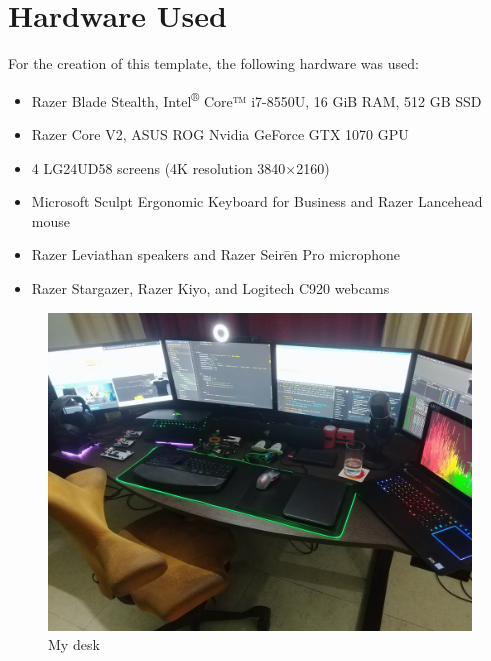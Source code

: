 \chapter{Hardware Used}
For the creation of this template, the following hardware was used:
\begin{itemize}
\item {}Razer Blade Stealth, Intel\textsuperscript{®} Core™ i7-8550U, 16 GiB RAM, 512 GB SSD
\item Razer Core V2, ASUS ROG Nvidia GeForce GTX 1070 GPU
\item 4 LG24UD58 screens (4K resolution 3840×2160)
\item {}Microsoft Sculpt Ergonomic Keyboard for Business and Razer Lancehead mouse
\item Razer Leviathan speakers and Razer Seirēn Pro microphone
\item Razer Stargazer, Razer Kiyo, and Logitech C920 webcams
\end{itemize}

\begin{figure}
\caption{My desk}
\centering
\includegraphics[scale=0.2]{gfx/desk}
\end{figure}
